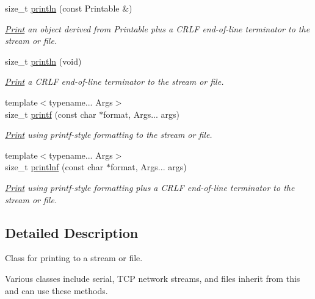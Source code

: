 \begin{DoxyCompactItemize}
\mbox{\label{class_print_a20f9e104153b62e720c9b4c348b44f00}} 
size\+\_\+t \mbox{\hyperlink{class_print_a20f9e104153b62e720c9b4c348b44f00}{println}} (const Printable \&)
\begin{DoxyCompactList}\small\item\em \mbox{\hyperlink{class_print}{Print}} an object derived from Printable plus a C\+R\+LF end-\/of-\/line terminator to the stream or file. \end{DoxyCompactList}\item 
\mbox{\label{class_print_a169b128f9e22f0c15883768f580541a2}} 
size\+\_\+t \mbox{\hyperlink{class_print_a169b128f9e22f0c15883768f580541a2}{println}} (void)
\begin{DoxyCompactList}\small\item\em \mbox{\hyperlink{class_print}{Print}} a C\+R\+LF end-\/of-\/line terminator to the stream or file. \end{DoxyCompactList}\item 
{\footnotesize template$<$typename... Args$>$ }\\size\+\_\+t \mbox{\hyperlink{class_print_a08a461c9fee5fd8f5795d6e9f61e3d5b}{printf}} (const char $\ast$format, Args... args)
\begin{DoxyCompactList}\small\item\em \mbox{\hyperlink{class_print}{Print}} using printf-\/style formatting to the stream or file. \end{DoxyCompactList}\item 
{\footnotesize template$<$typename... Args$>$ }\\size\+\_\+t \mbox{\hyperlink{class_print_afa41aa5211c54b7b4d79b9286880c337}{printlnf}} (const char $\ast$format, Args... args)
\begin{DoxyCompactList}\small\item\em \mbox{\hyperlink{class_print}{Print}} using printf-\/style formatting plus a C\+R\+LF end-\/of-\/line terminator to the stream or file. \end{DoxyCompactList}\end{DoxyCompactItemize}


\subsection{Detailed Description}
Class for printing to a stream or file. 

Various classes include serial, T\+CP network streams, and files inherit from this and can use these methods. 

